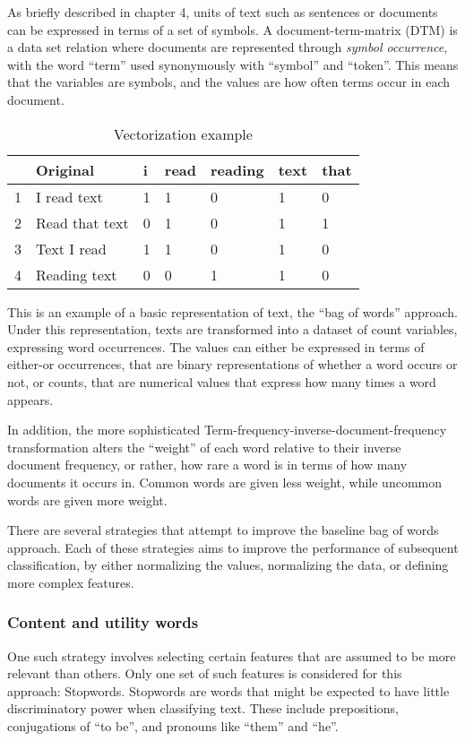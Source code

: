 \documentclass[12pt,twoside]{reedthesis}
\begin{document}
As briefly described in chapter 4, units of text such as sentences or
documents can be expressed in terms of a set of symbols. A
document-term-matrix (DTM) is a data set relation where documents are
represented through \emph{symbol occurrence}, with the word ``term''
used synonymously with ``symbol'' and ``token''. This means that the
variables are symbols, and the values are how often terms occur in each
document.
\begin{table}[ht]
\centering
\begin{tabular}{rllllll}
  \hline
 & Original & i & read & reading & text & that \\ 
  \hline
1 & I read text & 1 & 1 & 0 & 1 & 0 \\ 
  2 & Read that text & 0 & 1 & 0 & 1 & 1 \\ 
  3 & Text I read & 1 & 1 & 0 & 1 & 0 \\ 
  4 & Reading text & 0 & 0 & 1 & 1 & 0 \\ 
   \hline
\end{tabular}
\caption{Vectorization example} 
\end{table}
This is an example of a basic representation of text, the ``bag of
words'' approach. Under this representation, texts are transformed into
a dataset of count variables, expressing word occurrences. The values
can either be expressed in terms of either-or occurrences, that are
binary representations of whether a word occurs or not, or counts, that
are numerical values that express how many times a word appears.

In addition, the more sophisticated
Term-frequency-inverse-document-frequency transformation alters the
``weight'' of each word relative to their inverse document frequency, or
rather, how rare a word is in terms of how many documents it occurs in.
Common words are given less weight, while uncommon words are given more
weight.

There are several strategies that attempt to improve the baseline bag of
words approach. Each of these strategies aims to improve the performance
of subsequent classification, by either normalizing the values,
normalizing the data, or defining more complex features.

\subsubsection{Content and utility
words}\label{content-and-utility-words}

One such strategy involves selecting certain features that are assumed
to be more relevant than others. Only one set of such features is
considered for this approach: Stopwords. Stopwords are words that might
be expected to have little discriminatory power when classifying text.
These include prepositions, conjugations of ``to be'', and pronouns like
``them'' and ``he''.
\end{document}
